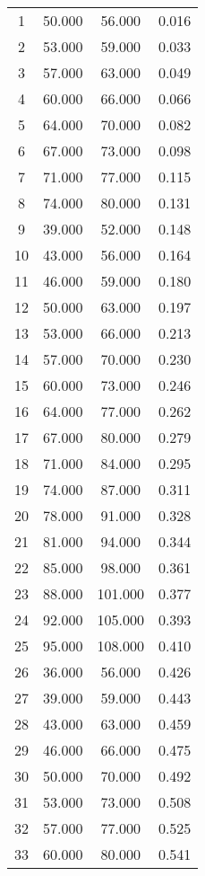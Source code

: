 % 
\begin{tabular}{cccc}
  \hline
  \hline
1 & 50.000 & 56.000 & 0.016 \\ 
  2 & 53.000 & 59.000 & 0.033 \\ 
  3 & 57.000 & 63.000 & 0.049 \\ 
  4 & 60.000 & 66.000 & 0.066 \\ 
  5 & 64.000 & 70.000 & 0.082 \\ 
  6 & 67.000 & 73.000 & 0.098 \\ 
  7 & 71.000 & 77.000 & 0.115 \\ 
  8 & 74.000 & 80.000 & 0.131 \\ 
  9 & 39.000 & 52.000 & 0.148 \\ 
  10 & 43.000 & 56.000 & 0.164 \\ 
  11 & 46.000 & 59.000 & 0.180 \\ 
  12 & 50.000 & 63.000 & 0.197 \\ 
  13 & 53.000 & 66.000 & 0.213 \\ 
  14 & 57.000 & 70.000 & 0.230 \\ 
  15 & 60.000 & 73.000 & 0.246 \\ 
  16 & 64.000 & 77.000 & 0.262 \\ 
  17 & 67.000 & 80.000 & 0.279 \\ 
  18 & 71.000 & 84.000 & 0.295 \\ 
  19 & 74.000 & 87.000 & 0.311 \\ 
  20 & 78.000 & 91.000 & 0.328 \\ 
  21 & 81.000 & 94.000 & 0.344 \\ 
  22 & 85.000 & 98.000 & 0.361 \\ 
  23 & 88.000 & 101.000 & 0.377 \\ 
  24 & 92.000 & 105.000 & 0.393 \\ 
  25 & 95.000 & 108.000 & 0.410 \\ 
  26 & 36.000 & 56.000 & 0.426 \\ 
  27 & 39.000 & 59.000 & 0.443 \\ 
  28 & 43.000 & 63.000 & 0.459 \\ 
  29 & 46.000 & 66.000 & 0.475 \\ 
  30 & 50.000 & 70.000 & 0.492 \\ 
  31 & 53.000 & 73.000 & 0.508 \\ 
  32 & 57.000 & 77.000 & 0.525 \\ 
  33 & 60.000 & 80.000 & 0.541 \\ 

\end{tabular}
